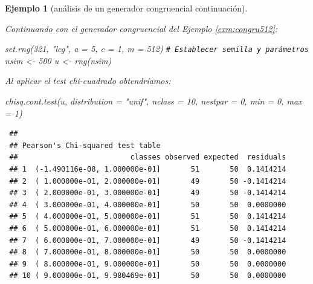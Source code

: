 \documentclass[
]{book}
\newenvironment{Shaded}{\begin{snugshade}}{\end{snugshade}}
\newcommand{\AttributeTok}[1]{\textcolor[rgb]{0.77,0.63,0.00}{#1}}
\newcommand{\CommentTok}[1]{\textcolor[rgb]{0.56,0.35,0.01}{\textit{#1}}}
\newcommand{\DecValTok}[1]{\textcolor[rgb]{0.00,0.00,0.81}{#1}}
\newcommand{\FunctionTok}[1]{\textcolor[rgb]{0.00,0.00,0.00}{#1}}
\newcommand{\NormalTok}[1]{#1}
\newcommand{\OtherTok}[1]{\textcolor[rgb]{0.56,0.35,0.01}{#1}}
\newcommand{\StringTok}[1]{\textcolor[rgb]{0.31,0.60,0.02}{#1}}
\theoremstyle{break}
\newtheorem{example}{Ejemplo}[chapter]
\theoremstyle{nonumberplain}
\renewcommand{\CommentTok}[1]{\textcolor[rgb]{0.41,0.41,0.41}{\texttt{#1}}}
\begin{document}
\begin{example}[análisis de un generador congruencial continuación]
\protect\hypertarget{exm:congru512b}{}\label{exm:congru512b}

Continuando con el generador congruencial del Ejemplo \ref{exm:congru512}:

\begin{Shaded}
\begin{Highlighting}[]
\FunctionTok{set.rng}\NormalTok{(}\DecValTok{321}\NormalTok{, }\StringTok{"lcg"}\NormalTok{, }\AttributeTok{a =} \DecValTok{5}\NormalTok{, }\AttributeTok{c =} \DecValTok{1}\NormalTok{, }\AttributeTok{m =} \DecValTok{512}\NormalTok{)  }\CommentTok{\# Establecer semilla y parámetros}
\NormalTok{nsim }\OtherTok{\textless{}{-}} \DecValTok{500}
\NormalTok{u }\OtherTok{\textless{}{-}} \FunctionTok{rng}\NormalTok{(nsim)}
\end{Highlighting}
\end{Shaded}

Al aplicar el test chi-cuadrado obtendríamos:

\begin{Shaded}
\begin{Highlighting}[]
\FunctionTok{chisq.cont.test}\NormalTok{(u, }\AttributeTok{distribution =} \StringTok{"unif"}\NormalTok{, }
                \AttributeTok{nclass =} \DecValTok{10}\NormalTok{, }\AttributeTok{nestpar =} \DecValTok{0}\NormalTok{, }\AttributeTok{min =} \DecValTok{0}\NormalTok{, }\AttributeTok{max =} \DecValTok{1}\NormalTok{)}
\end{Highlighting}
\end{Shaded}

\begin{verbatim}
 ## 
 ## Pearson's Chi-squared test table
 ##                          classes observed expected  residuals
 ## 1  (-1.490116e-08, 1.000000e-01]       51       50  0.1414214
 ## 2  ( 1.000000e-01, 2.000000e-01]       49       50 -0.1414214
 ## 3  ( 2.000000e-01, 3.000000e-01]       49       50 -0.1414214
 ## 4  ( 3.000000e-01, 4.000000e-01]       50       50  0.0000000
 ## 5  ( 4.000000e-01, 5.000000e-01]       51       50  0.1414214
 ## 6  ( 5.000000e-01, 6.000000e-01]       51       50  0.1414214
 ## 7  ( 6.000000e-01, 7.000000e-01]       49       50 -0.1414214
 ## 8  ( 7.000000e-01, 8.000000e-01]       50       50  0.0000000
 ## 9  ( 8.000000e-01, 9.000000e-01]       50       50  0.0000000
 ## 10 ( 9.000000e-01, 9.980469e-01]       50       50  0.0000000
\end{verbatim}


\end{example}
\end{document}
